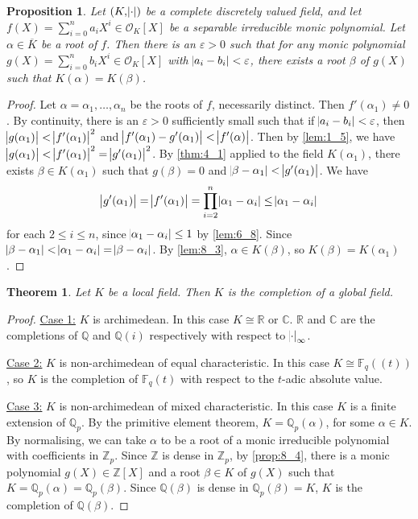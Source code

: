 \documentclass[11pt]{article}
\theoremstyle{definition}
\theoremstyle{plain}
\newtheorem{theorem}[definition]{Theorem}
\newtheorem{proposition}[definition]{Proposition}
\theoremstyle{remark}
\newcommand{\FF}{\mathbb{F}}
\newcommand{\ZZ}{\mathbb{Z}}
\newcommand{\QQ}{\mathbb{Q}}
\newcommand{\RR}{\mathbb{R}}
\newcommand{\CC}{\mathbb{C}}
\newcommand{\cO}{\mathcal{O}}
\begin{document}
\begin{proposition}\label{prop:8_4}
    Let $(K, \abs{\cdot})$ be a complete discretely valued field, and let $f(X) = \sum_{i=0}^n a_i X^i \in \cO_K[X]$ be a separable irreducible monic polynomial. Let $\alpha \in \overline{K}$ be a root of $f$. Then there is an $\varepsilon > 0$ such that for any monic polynomial $g(X) = \sum_{i=0}^n b_i X^i \in \cO_K[X]$ with $\abs{a_i - b_i} < \varepsilon$, there exists a root $\beta$ of $g(X)$ such that $K(\alpha) = K(\beta)$.
\end{proposition}
\begin{proof}
    Let $\alpha = \alpha_1, \ldots, \alpha_n$ be the roots of $f$, necessarily distinct. Then $f'(\alpha_1) \neq 0$. By continuity, there is an $\varepsilon > 0$ sufficiently small such that if $\abs{a_i - b_i} < \varepsilon$, then $\abs{g(\alpha_1)} < \abs{f'(\alpha_1)}^2$ and $\abs{f'(\alpha_1) - g'(\alpha_1)} < \abs{f'(\alpha)}$. Then by \autoref{lem:1_5}, we have $\abs{g(\alpha_1)} < \abs{f'(\alpha_1)}^2 = \abs{g'(\alpha_1)}^2$. By \autoref{thm:4_1} applied to the field $K(\alpha_1)$, there exists $\beta \in K(\alpha_1)$ such that $g(\beta) = 0$ and $\abs{\beta - \alpha_1} < \abs{g'(\alpha_1)}$. We have
    \begin{equation*}
        \abs{g'(\alpha_1)} = \abs{f'(\alpha_1)} = \prod_{i=2}^n \abs{\alpha_1 - \alpha_i} \le \abs{\alpha_1 - \alpha_i}
    \end{equation*}
    for each $2 \le i \le n$, since $\abs{\alpha_1 - \alpha_i} \le 1$ by \autoref{lem:6_8}. Since $\abs{\beta - \alpha_1} < \abs{\alpha_1 - \alpha_i} = \abs{\beta - \alpha_i}$. By \autoref{lem:8_3}, $\alpha \in K(\beta)$, so $K(\beta) = K(\alpha_1)$.
\end{proof}

\begin{theorem}\label{thm:8_5}
    Let $K$ be a local field. Then $K$ is the completion of a global field.
\end{theorem}
\begin{proof}
    \underline{Case 1:} $K$ is archimedean. In this case $K \cong \RR$ or $\CC$. $\RR$ and $\CC$ are the completions of $\QQ$ and $\QQ(i)$ respectively with respect to $\abs{\cdot}_\infty$.

    \underline{Case 2:} $K$ is non-archimedean of equal characteristic. In this case $K \cong \FF_q((t))$, so $K$ is the completion of $\FF_q(t)$ with respect to the $t$-adic absolute value.

    \underline{Case 3:} $K$ is non-archimedean of mixed characteristic. In this case $K$ is a finite extension of $\QQ_p$. By the primitive element theorem, $K = \QQ_p(\alpha)$, for some $\alpha \in K$. By normalising, we can take $\alpha$ to be a root of a monic irreducible polynomial with coefficients in $\ZZ_p$. Since $\ZZ$ is dense in $\ZZ_p$, by \autoref{prop:8_4}, there is a monic polynomial $g(X) \in \ZZ[X]$ and a root $\beta \in K$ of $g(X)$ such that $K = \QQ_p(\alpha) = \QQ_p(\beta)$. Since $\QQ(\beta)$ is dense in $\QQ_p(\beta) = K$, $K$ is the completion of $\QQ(\beta)$.
\end{proof}
\end{document}

